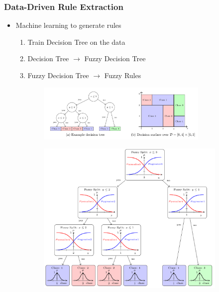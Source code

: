 \documentclass[
	10pt,
	t		%
]{beamer}
\begin{document}
\begin{frame}
	\frametitle{Data-Driven Rule Extraction}
	\begin{itemize}
		\item Machine learning to generate rules {\scriptsize  \cite{CROCKETT20062809}}
		      \begin{enumerate}
			      \item Train Decision Tree on the data
			      \item Decision Tree $\rightarrow$ Fuzzy Decision Tree
			      \item Fuzzy Decision Tree $\rightarrow$ Fuzzy Rules
		      \end{enumerate}
	\end{itemize}
	
	\begin{figure}

		\begin{subfigure}[t]{0.47\textwidth}
			\centering
			\includegraphics[width=0.9\textwidth, trim={1cm 2.8cm 26cm 0.5cm},clip]{figures/decision-tree.png}
		\end{subfigure}
		\begin{subfigure}[t]{0.52\textwidth}
			\centering
			\includegraphics[width=1\textwidth, trim={0 0.2cm 0cm 0cm},clip]{figures/fuzzy-decision-tree.png}
		\end{subfigure}
	\end{figure}
	
	
\end{frame}
\end{document}

